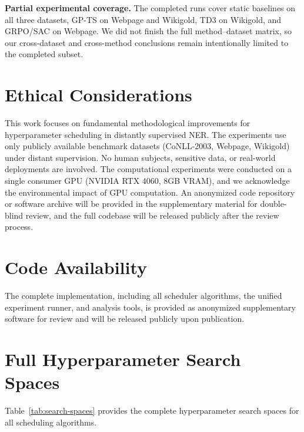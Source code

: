 \documentclass[11pt]{article}
\begin{document}
\textbf{Partial experimental coverage.} The completed runs cover static baselines on all three datasets, GP-TS on Webpage and Wikigold, TD3 on Wikigold, and GRPO/SAC on Webpage. We did not finish the full method--dataset matrix, so our cross-dataset and cross-method conclusions remain intentionally limited to the completed subset.

\section{Ethical Considerations}

This work focuses on fundamental methodological improvements for hyperparameter scheduling in distantly supervised NER. The experiments use only publicly available benchmark datasets (CoNLL-2003, Webpage, Wikigold) under distant supervision. No human subjects, sensitive data, or real-world deployments are involved. The computational experiments were conducted on a single consumer GPU (NVIDIA RTX 4060, 8GB VRAM), and we acknowledge the environmental impact of GPU computation. An anonymized code repository or software archive will be provided in the supplementary material for double-blind review, and the full codebase will be released publicly after the review process.

\section*{Code Availability}
The complete implementation, including all scheduler algorithms, the unified experiment runner, and analysis tools, is provided as anonymized supplementary software for review and will be released publicly upon publication.




\appendix

\section{Full Hyperparameter Search Spaces}
\label{sec:search-spaces}

Table~\ref{tab:search-spaces} provides the complete hyperparameter search spaces for all scheduling algorithms.
\end{document}
